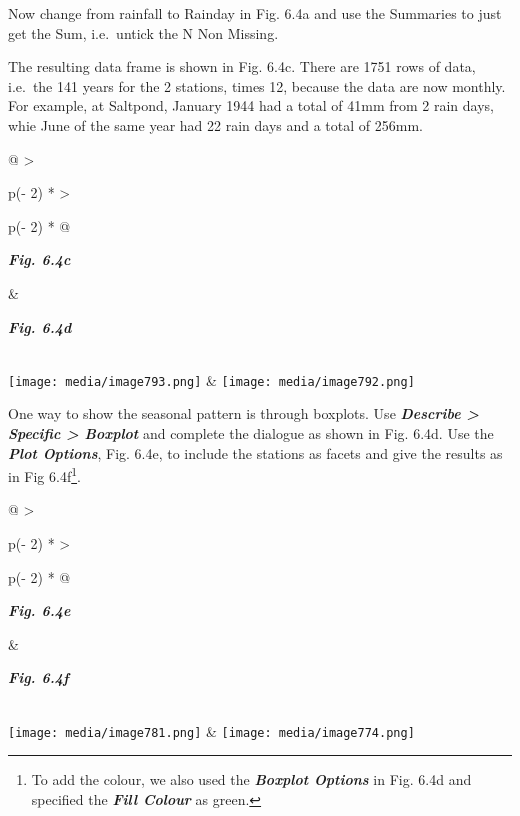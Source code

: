 \documentclass[
  letterpaper,
  DIV=11,
  numbers=noendperiod]{scrreprt}
\begin{document}
Now change from rainfall to Rainday in Fig. 6.4a and use the Summaries
to just get the Sum, i.e.~untick the N Non Missing.

The resulting data frame is shown in Fig. 6.4c. There are 1751 rows of
data, i.e.~the 141 years for the 2 stations, times 12, because the data
are now monthly. For example, at Saltpond, January 1944 had a total of
41mm from 2 rain days, whie June of the same year had 22 rain days and a
total of 256mm.

\begin{longtable}[]{@{}
  >{\raggedright\arraybackslash}p{(\columnwidth - 2\tabcolsep) * }
  >{\raggedright\arraybackslash}p{(\columnwidth - 2\tabcolsep) * }@{}}
\toprule\noalign{}
\begin{minipage}[b]{\linewidth}\raggedright
\textbf{\emph{Fig. 6.4c}}
\end{minipage} & \begin{minipage}[b]{\linewidth}\raggedright
\textbf{\emph{Fig. 6.4d}}
\end{minipage} \\
\midrule\noalign{}
\endhead
\bottomrule\noalign{}
\endlastfoot
\texttt{[image: media/image793.png]} &
\texttt{[image: media/image792.png]} \\
\end{longtable}

One way to show the seasonal pattern is through boxplots. Use
\textbf{\emph{Describe \textgreater{} Specific \textgreater{} Boxplot}}
and complete the dialogue as shown in Fig. 6.4d. Use the
\textbf{\emph{Plot Options}}, Fig. 6.4e, to include the stations as
facets and give the results as in Fig 6.4f\footnote{To add the colour,
  we also used the \textbf{\emph{Boxplot Options}} in Fig. 6.4d and
  specified the \textbf{\emph{Fill Colour}} as green.}.

\begin{longtable}[]{@{}
  >{\raggedright\arraybackslash}p{(\columnwidth - 2\tabcolsep) * }
  >{\raggedright\arraybackslash}p{(\columnwidth - 2\tabcolsep) * }@{}}
\toprule\noalign{}
\begin{minipage}[b]{\linewidth}\raggedright
\textbf{\emph{Fig. 6.4e}}
\end{minipage} & \begin{minipage}[b]{\linewidth}\raggedright
\textbf{\emph{Fig. 6.4f}}
\end{minipage} \\
\midrule\noalign{}
\endhead
\bottomrule\noalign{}
\endlastfoot
\texttt{[image: media/image781.png]} &
\texttt{[image: media/image774.png]} \\
\end{longtable}
\end{document}
